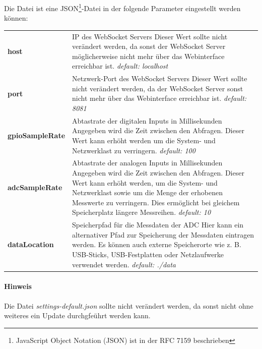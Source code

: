 Die Datei ist eine JSON\footnote{JavaScript Object Notation (JSON) ist in der RFC 7159 beschrieben}-Datei in der folgende Parameter eingestellt werden können:\\

\begin{longtabu} to \textwidth {X[1] X[3]}
    
  \textbf{host} & IP des WebSocket Servers\newline
  Dieser Wert sollte nicht verändert werden, da sonst der WebSocket Server möglicherweise nicht mehr über das Webinterface erreichbar ist.\newline
  \textit{default: localhost}\\
  \textbf{port} & Netzwerk-Port des WebSocket Servers\newline
  Dieser Wert sollte nicht verändert werden, da der WebSocket Server sonst nicht mehr über das Webinterface erreichbar ist.\newline
  \textit{default: 8081}\\
  \textbf{gpioSampleRate} & Abtastrate der digitalen Inputs in Millisekunden\newline
  Angegeben wird die Zeit zwischen den Abfragen. Dieser Wert kann erhöht werden um die System- und Netzwerklast zu verringern.\newline
  \textit{default: 100}\\
  \textbf{adcSampleRate} & Abtastrate der analogen Inputs in Millisekunden\newline
  Angegeben wird die Zeit zwischen den Abfragen. Dieser Wert kann erhöht werden, um die System- und Netzwerklast sowie um die Menge der erhobenen Messwerte zu verringern. Dies ermöglicht bei gleichem Speicherplatz längere Messreihen.\newline
  \textit{default: 10}\\
  \textbf{dataLocation} & Speicherpfad für die Messdaten der ADC\newline
  Hier kann ein alternativer Pfad zur Speicherung der Messdaten eintragen werden. Es können auch externe Speicherorte wie z. B. USB-Sticks, USB-Festplatten oder Netzlaufwerke verwendet werden.\newline
  \textit{default: ./data}
\end{longtabu}

\paragraph{Hinweis} Die Datei \textit{settings-default.json} sollte nicht verändert werden, da sonst nicht ohne weiteres ein Update durchgfeührt werden kann.
